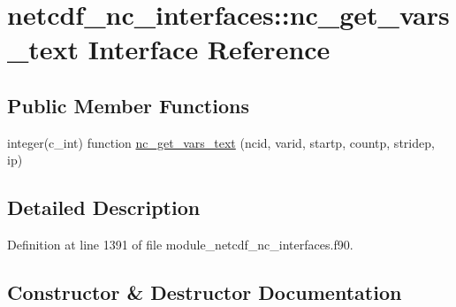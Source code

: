 \hypertarget{interfacenetcdf__nc__interfaces_1_1nc__get__vars__text}{}\section{netcdf\+\_\+nc\+\_\+interfaces\+:\+:nc\+\_\+get\+\_\+vars\+\_\+text Interface Reference}
\label{interfacenetcdf__nc__interfaces_1_1nc__get__vars__text}
\subsection*{Public Member Functions}
\begin{DoxyCompactItemize}
\item 
integer(c\+\_\+int) function \hyperlink{interfacenetcdf__nc__interfaces_1_1nc__get__vars__text_a3e272b671605e9ed06de754e34ea3ecf}{nc\+\_\+get\+\_\+vars\+\_\+text} (ncid, varid, startp, countp, stridep, ip)
\end{DoxyCompactItemize}


\subsection{Detailed Description}


Definition at line 1391 of file module\+\_\+netcdf\+\_\+nc\+\_\+interfaces.\+f90.



\subsection{Constructor \& Destructor Documentation}
\mbox{\label{interfacenetcdf__nc__interfaces_1_1nc__get__vars__text_a3e272b671605e9ed06de754e34ea3ecf}} 
